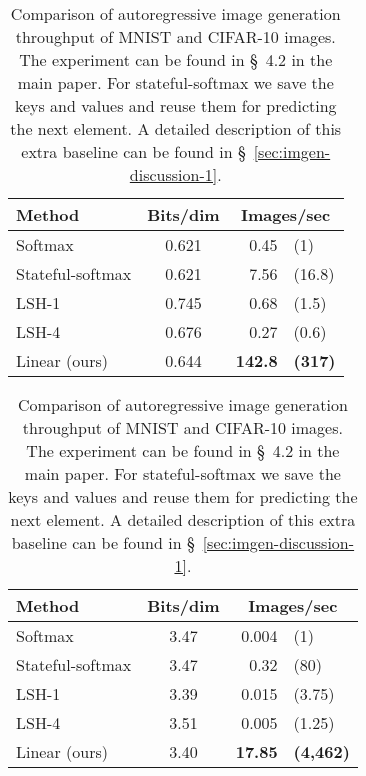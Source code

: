 \documentclass{article}
\begin{document}
\begin{table}
    \begin{subtable}[t]{0.5\textwidth}
        \begin{center}
        \begin{tabular}{lcrl}
            Method & Bits/dim & \multicolumn{2}{c}{Images/sec}\\
            \hline
            Softmax & 0.621 & 0.45 & (1) \\
            Stateful-softmax & 0.621 & 7.56 & (16.8) \\
            LSH-1 & 0.745 & 0.68 & (1.5) \\
            LSH-4 & 0.676 & 0.27 & (0.6) \\
            \hline
            Linear (ours) & 0.644 & \textbf{142.8} & \textbf{(317)}
        \end{tabular}
        \end{center}
        \caption{Image generation on MNIST}
        \label{tab:mnist-rnn}
    \end{subtable}
    \begin{subtable}[t]{0.5\textwidth}
        \begin{center}
        \begin{tabular}{lcrl}
            Method & Bits/dim & \multicolumn{2}{c}{Images/sec} \\
            \hline
            Softmax & 3.47 & 0.004 & (1) \\
            Stateful-softmax & 3.47 & 0.32 & (80) \\
            LSH-1 & 3.39 & 0.015  & (3.75) \\
            LSH-4 & 3.51 & 0.005  & (1.25) \\
            \hline
            Linear (ours) & 3.40 & \textbf{17.85} & \textbf{(4,462)}
        \end{tabular}
        \end{center}
        \caption{Image generation on CIFAR-10}
        \label{tab:cifar-rnn}
    \end{subtable}
    \caption{Comparison of autoregressive image generation throughput of MNIST
             and CIFAR-10 images. The experiment can be found in \S~4.2 in the
             main paper. For stateful-softmax we save the keys and values and
             reuse them for predicting the next element. A detailed description
             of this extra baseline can be found in
             \S~\ref{sec:imgen-discussion-1}.}
    \label{tab:rnn}
\end{table}
\end{document}
